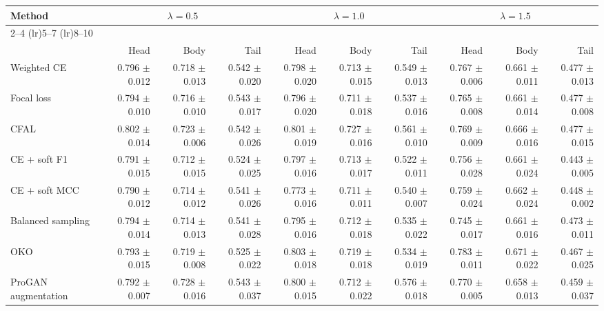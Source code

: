 \begin{tabular}{lrrrrrrrrr}
\toprule
Method & \multicolumn{3}{c}{$\lambda=0.5$} & \multicolumn{3}{c}{$\lambda=1.0$} & \multicolumn{3}{c}{$\lambda=1.5$} \\ \cmidrule(lr){2--4} \cmidrule(lr){5--7} \cmidrule(lr){8--10}\\
 & Head & Body & Tail & Head & Body & Tail & Head & Body & Tail\\
\midrule
Weighted CE & \num{0.796} $\pm$ \num{0.012} & \num{0.718} $\pm$ \num{0.013} & \num{0.542} $\pm$ \num{0.020} & \num{0.798} $\pm$ \num{0.020} & \num{0.713} $\pm$ \num{0.015} & \num{0.549} $\pm$ \num{0.013} & \num{0.767} $\pm$ \num{0.006} & \num{0.661} $\pm$ \num{0.011} & \num{0.477} $\pm$ \num{0.013}\\
Focal loss & \num{0.794} $\pm$ \num{0.010} & \num{0.716} $\pm$ \num{0.010} & \num{0.543} $\pm$ \num{0.017} & \num{0.796} $\pm$ \num{0.020} & \num{0.711} $\pm$ \num{0.018} & \num{0.537} $\pm$ \num{0.016} & \num{0.765} $\pm$ \num{0.008} & \num{0.661} $\pm$ \num{0.014} & \num{0.477} $\pm$ \num{0.008}\\
CFAL & \num{0.802} $\pm$ \num{0.014} & \num{0.723} $\pm$ \num{0.006} & \num{0.542} $\pm$ \num{0.026} & \num{0.801} $\pm$ \num{0.019} & \num{0.727} $\pm$ \num{0.016} & \num{0.561} $\pm$ \num{0.010} & \num{0.769} $\pm$ \num{0.009} & \num{0.666} $\pm$ \num{0.016} & \num{0.477} $\pm$ \num{0.015}\\
CE + soft F1 & \num{0.791} $\pm$ \num{0.015} & \num{0.712} $\pm$ \num{0.015} & \num{0.524} $\pm$ \num{0.025} & \num{0.797} $\pm$ \num{0.016} & \num{0.713} $\pm$ \num{0.017} & \num{0.522} $\pm$ \num{0.011} & \num{0.756} $\pm$ \num{0.028} & \num{0.661} $\pm$ \num{0.024} & \num{0.443} $\pm$ \num{0.005}\\
CE + soft MCC & \num{0.790} $\pm$ \num{0.012} & \num{0.714} $\pm$ \num{0.012} & \num{0.541} $\pm$ \num{0.026} & \num{0.773} $\pm$ \num{0.016} & \num{0.711} $\pm$ \num{0.011} & \num{0.540} $\pm$ \num{0.007} & \num{0.759} $\pm$ \num{0.024} & \num{0.662} $\pm$ \num{0.024} & \num{0.448} $\pm$ \num{0.002}\\
Balanced sampling & \num{0.794} $\pm$ \num{0.014} & \num{0.714} $\pm$ \num{0.013} & \num{0.541} $\pm$ \num{0.028} & \num{0.795} $\pm$ \num{0.016} & \num{0.712} $\pm$ \num{0.018} & \num{0.535} $\pm$ \num{0.022} & \num{0.745} $\pm$ \num{0.017} & \num{0.661} $\pm$ \num{0.016} & \num{0.473} $\pm$ \num{0.011}\\
OKO & \num{0.793} $\pm$ \num{0.015} & \num{0.719} $\pm$ \num{0.008} & \num{0.525} $\pm$ \num{0.022} & \num{0.803} $\pm$ \num{0.018} & \num{0.719} $\pm$ \num{0.018} & \num{0.534} $\pm$ \num{0.019} & \num{0.783} $\pm$ \num{0.011} & \num{0.671} $\pm$ \num{0.022} & \num{0.467} $\pm$ \num{0.025}\\
ProGAN augmentation & \num{0.792} $\pm$ \num{0.007} & \num{0.728} $\pm$ \num{0.016} & \num{0.543} $\pm$ \num{0.037} & \num{0.800} $\pm$ \num{0.015} & \num{0.712} $\pm$ \num{0.022} & \num{0.576} $\pm$ \num{0.018} & \num{0.770} $\pm$ \num{0.005} & \num{0.658} $\pm$ \num{0.013} & \num{0.459} $\pm$ \num{0.037}\\
\bottomrule
\end{tabular}
